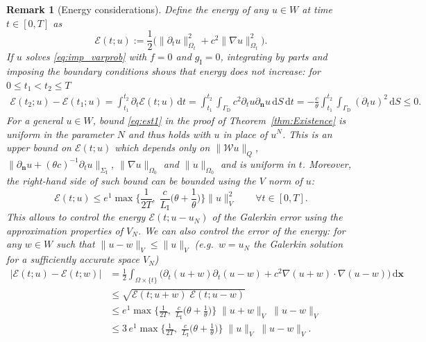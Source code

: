 \documentclass[a4paper]{article}
\theoremstyle{plain}
\newtheorem{remark}[theorem]{Remark}
\theoremstyle{definition}
\newcommand{\operator}[1]{\mathcal{#1}}
\newcommand{\dx}{{\,\mathrm{d}\vect x}}
\newcommand{\dt}{{\,\mathrm{d}t}}
\newcommand{\dS}{{\,\mathrm{d}S}}
\newcommand{\Grad}[1]{\nabla #1}
\newcommand{\TimeDer}{{\partial^{}_t}}
\newcommand{\NormDer}{{\partial_{\bm{n}}}}
\newcommand{\vect}[1]{\bm{#1}}
\newcommand{\LI}{L_{\mathrm I}}
\newcommand{\GD}{{\Gamma_{\mathrm D}}}
\newcommand{\SI}{{\Sigma_{\mathrm I}}}
\newcommand{\gI}{{g_{\mathrm I}}}
\newcommand{\oW}{{\operator{W}}}
\newcommand{\OZ}{{\Omega_0}}
\begin{document}
\begin{remark}[Energy considerations]
\label{remark:EnergyDecay}
	Define the energy of any $u\in W$ at time $t\in[0,T]$ as
	\begin{equation*}
	\mathcal E(t; u) := \frac12 \big(\|\TimeDer u\|_{\Omega_t}^2 + c^2\|\Grad u\|_{\Omega_t}^2\big).
	\label{eq:Energy}
	\end{equation*}
	If $u$ solves \eqref{eq:imp_varprob} with $f = 0$ and $\gI = 0$, integrating by parts and imposing the boundary conditions shows that energy does not increase: for $0\le t_1<t_2\le T$
	\begin{equation*}
	\begin{split}
		\mathcal E(t_2; u) - \mathcal E(t_1; u) =
		\int_{t_1}^{t_2}\TimeDer \mathcal E(t; u) \dt =
		\int_{t_1}^{t_2}\int_{\GD} c^2 \TimeDer u \NormDer u \dS \dt =
		- \frac{c}\theta \int_{t_1}^{t_2}\int_\GD (\TimeDer u)^2 \dS \le 0.
	\end{split}
	\end{equation*}
	For a general $u\in W$, bound \eqref{eq:est1} in the proof of Theorem~\ref{thm:Existence} is uniform in the parameter $N$ and thus holds with $u$ in place of $u^N$.
	This is an upper bound on $\mathcal E(t; u)$ which depends only on $\|\oW u\|_Q$, $\|\NormDer u+(\theta c)^{-1}\TimeDer u\|_\SI$, $\|\Grad u\|_\OZ$ and $\|u\|_\OZ$ and is uniform in $t$.
	Moreover, the right-hand side of such bound can be bounded using the $V$ norm of $u$:
	\begin{equation*}
\mathcal E(t; u)\le
		e^1\max\Big\{\frac1{2T},\;\frac{c}{\LI}\Big(\theta+\frac1\theta\Big)\Big\}\|u\|_V^2
		\qquad\forall t\in[0,T].
	\end{equation*}
This allows to control the energy $\mathcal E(t;u-u_N)$ of the Galerkin error using the approximation properties of $V_N$.
We can also control the error of the energy: for any $w\in W$ such that $\|u-w\|_V\le\|u\|_V$ (e.g.\ $w=u_N$ the Galerkin solution for a sufficiently accurate space $V_N$)
\begin{align*}
|\mathcal E(t;u) - \mathcal E(t; w)|
&=\frac12\int_{\Omega\times\{t\}}
\Big(\TimeDer(u+w)\TimeDer(u-w)+c^2\nabla(u+w)\cdot\nabla(u-w)\Big)\dx\\
&\le \sqrt{\mathcal E(t;u+w)\;\mathcal E(t;u-w)}\\
&\le e^1\max\Big\{\frac1{2T},\;\frac{c}{\LI}\Big(\theta+\frac1\theta\Big)\Big\}
\;\|u+w\|_V \;\|u-w\|_V\\
&\le 3\,e^1\max\Big\{\frac1{2T},\;\frac{c}{\LI}\Big(\theta+\frac1\theta\Big)\Big\}
\;\|u\|_V \;\|u-w\|_V.
\end{align*}
\end{remark}
\end{document}
